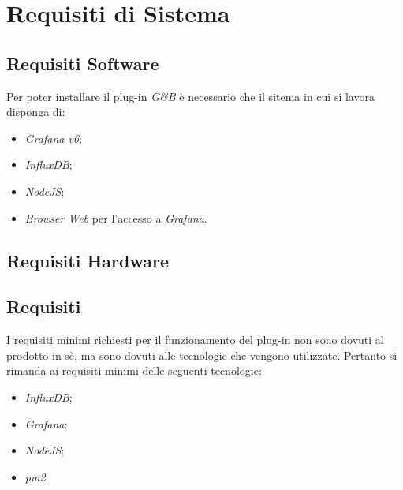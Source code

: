 \section{Requisiti di Sistema}\label{Requisiti}

\subsection{Requisiti Software}\label{RS}
Per poter installare il plug-in \textit{G\&B} è necessario che il sitema in cui si lavora disponga di:
\begin{itemize}
	\item \textit{Grafana v6};
	\item \textit{InfluxDB};
	\item \textit{NodeJS};
	\item \textit{Browser Web} per l'accesso a \textit{Grafana}.
\end{itemize}

\subsection{Requisiti Hardware}\label{RH}
\subsection{Requisiti}\label{Requisiti}
I requisiti minimi richiesti per il funzionamento del plug-in non sono dovuti al prodotto in sè, ma sono dovuti alle tecnologie che vengono utilizzate. Pertanto si rimanda ai requisiti minimi delle seguenti tecnologie:
\begin{itemize}
	\item \textit{InfluxDB};
	\item \textit{Grafana};
	\item \textit{NodeJS}; 
	\item \textit{pm2}. 
\end{itemize}